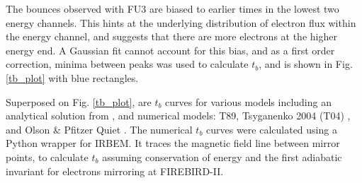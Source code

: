 \documentclass[draft,linenumbers]{agujournal}
\begin{document}
The bounces observed with FU3 are biased to earlier times in the lowest two energy channels. This hints at the underlying distribution of electron flux within the energy channel, and suggests that there are more electrons at the higher energy end. A Gaussian fit cannot account for this bias, and as a first order correction, minima between peaks was used to calculate $t_b$, and is shown in Fig. \ref{tb_plot} with blue rectangles.

Superposed on Fig. \ref{tb_plot}, are $t_b$ curves for various models including an analytical solution from \citet{Schulz74}, and numerical models: T89, Tsyganenko 2004 (T04) \citep{Tsyganenko05}, and Olson \& Pfitzer Quiet \citep{Olson82}. The numerical $t_b$ curves were calculated using a Python wrapper for IRBEM. It traces the magnetic field line between mirror points, to calculate $t_b$ assuming conservation of energy and the first adiabatic invariant for electrons mirroring at FIREBIRD-II. 

%
\end{document}
